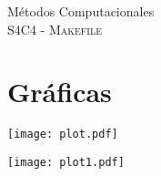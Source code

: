 \documentclass[11pt,letterpaper]{article}
\begin{document}
\begin{center}
{\Large Métodos Computacionales} \\
S4C4 - \textsc{Makefile}\\
\end{center}


\noindent
\section{Gr\'aficas}
\begin{center}
\texttt{[image: plot.pdf]} 
\begin{center}
\end{center}
\texttt{[image: plot1.pdf]} 
\end{center}
\end{document}
